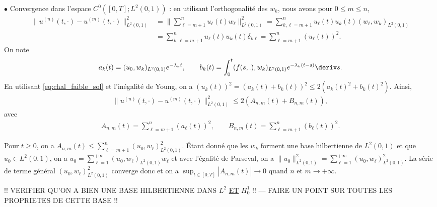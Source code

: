\documentclass[12pt,a4paper,twoside]{article}
\begin{document}
$\bullet$ Convergence dans l'espace $C^0([0,T];L^2(0,1))$ :
en utilisant l'orthogonalit\'e des $w_k$, nous avons pour $0 \leq m \leq n$,
\begin{align*}
  \| u^{(n)}(t,\cdot) - u^{(m)}(t,\cdot) \|_{L^2(0,1)}^2
  &= \| \sum_{\ell = m+1}^n u_{\ell}(t) w_{\ell} \|_{L^2(0,1)}^2
  = \sum_{k,\ell = m+1}^n u_{\ell}(t) u_{k}(t) (w_{\ell} , w_{k})_{L^2(0,1)}
  \\
  &= \sum_{k,\ell = m+1}^n u_{\ell}(t) u_{k}(t) \delta_{k \ell}
  = \sum_{\ell = m+1}^n (u_{\ell}(t))^2 .
\end{align*}
On note 
\begin{align*}
  a_k (t) = (u_0 , w_k)_{L^2(0,1)} e^{- \lambda_k t} , \qquad
  b_k(t) = \int_{0}^{t} (f(s,.),w_k)_{L^2(0,1)} e^{-\lambda_k(t-s)} \deriv s .
\end{align*}
En utilisant \eqref{eq:chal_faible_sol} et l'in\'egalit\'e de Young,
on a $(u_{k}(t))^2 = (a_k(t) + b_k(t))^2 \leq 2 (a_k(t)^2 + b_k(t)^2)$.
Ainsi,
\begin{align*}
  \| u^{(n)}(t,\cdot) - u^{(m)}(t,\cdot) \|_{L^2(0,1)}^2
  \leq 2(A_{n,m}(t) + B_{n,m}(t)) ,
\end{align*}
avec 
\begin{align*}
  A_{n,m}(t) = \sum_{\ell=m+1}^n (a_{\ell}(t))^2 , \qquad
  B_{n,m}(t) = \sum_{\ell=m+1}^n (b_{\ell}(t))^2 .
\end{align*}

Pour $t \geq 0$, on a $A_{n,m}(t) \leq \sum_{\ell = m+1}^n (u_0 , w_{\ell})_{L^2(0,1)}^2$.
\'Etant donn\'e que les $w_k$ forment une base hilbertienne de $L^2(0,1)$ et que
$u_0 \in L^2(0,1)$, on a $u_0 = \sum_{\ell = 1}^{+\infty} ( u_0, w_{\ell})_{L^2(0,1)} w_{\ell}$
et avec l'\'egalit\'e de Parseval, 
on a $\| u_0 \|_{L^2(0,1)}^2 = \sum_{\ell = 1}^{+\infty} ( u_0, w_{\ell})_{L^2(0,1)}^2$.
La s\'erie de terme g\'en\'eral $( u_0, w_{\ell})_{L^2(0,1)}^2$ converge donc
et on a $\sup_{t \in [0,T]} |A_{n,m}(t)| \to 0$ quand $n$ et $m \to +\infty$.


!! VERIFIER QU'ON A BIEN UNE BASE HILBERTIENNE DANS $L^2$ \underline{ET} $H^1_0$ !! 
--- FAIRE UN POINT SUR TOUTES LES PROPRIETES DE CETTE BASE !!
\end{document}
